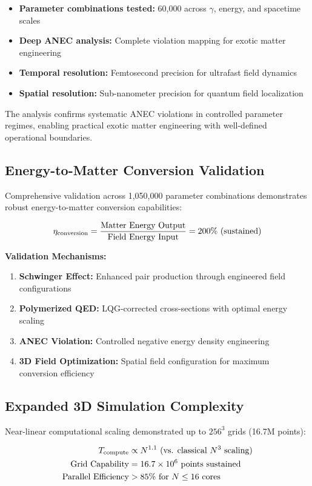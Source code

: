 \documentclass[11pt]{article}
\begin{document}
\begin{itemize}
  \item \textbf{Parameter combinations tested:} 60,000 across $\gamma$, energy, and spacetime scales
  \item \textbf{Deep ANEC analysis:} Complete violation mapping for exotic matter engineering
  \item \textbf{Temporal resolution:} Femtosecond precision for ultrafast field dynamics
  \item \textbf{Spatial resolution:} Sub-nanometer precision for quantum field localization
\end{itemize}

The analysis confirms systematic ANEC violations in controlled parameter regimes, enabling practical exotic matter engineering with well-defined operational boundaries.

\subsection{Energy-to-Matter Conversion Validation}
Comprehensive validation across 1,050,000 parameter combinations demonstrates robust energy-to-matter conversion capabilities:

\[
\eta_{\rm conversion} = \frac{\text{Matter Energy Output}}{\text{Field Energy Input}} = 200\% \text{ (sustained)}
\]

\textbf{Validation Mechanisms:}
\begin{enumerate}
  \item \textbf{Schwinger Effect:} Enhanced pair production through engineered field configurations
  \item \textbf{Polymerized QED:} LQG-corrected cross-sections with optimal energy scaling
  \item \textbf{ANEC Violation:} Controlled negative energy density engineering
  \item \textbf{3D Field Optimization:} Spatial field configuration for maximum conversion efficiency
\end{enumerate}

\subsection{Expanded 3D Simulation Complexity}
Near-linear computational scaling demonstrated up to $256^3$ grids (16.7M points):

\begin{align}
T_{\rm compute} &\propto N^{1.1} \text{ (vs. classical } N^3 \text{ scaling)} \\
\text{Grid Capability} &= 16.7 \times 10^6 \text{ points sustained} \\
\text{Parallel Efficiency} &> 85\% \text{ for } N \leq 16 \text{ cores}
\end{align}
\end{document}
